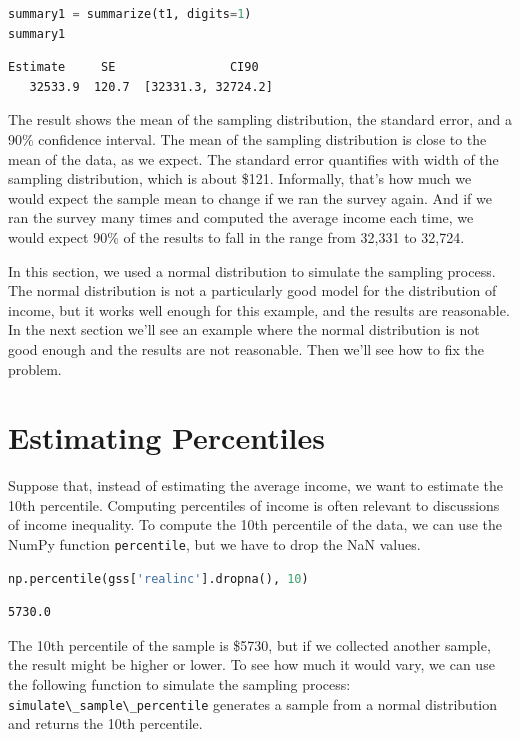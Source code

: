 \begin{lstlisting}[language=Python,style=source]
summary1 = summarize(t1, digits=1)
summary1
\end{lstlisting}

\begin{lstlisting}[style=output]
  Estimate     SE                CI90
   32533.9  120.7  [32331.3, 32724.2]
\end{lstlisting}

The result shows the mean of the sampling distribution, the standard
error, and a 90\% confidence interval. The mean of the sampling
distribution is close to the mean of the data, as we expect. The
standard error quantifies with width of the sampling distribution, which
is about \$121. Informally, that's how much we would expect the sample
mean to change if we ran the survey again. And if we ran the survey many
times and computed the average income each time, we would expect 90\% of
the results to fall in the range from 32,331 to 32,724.

In this section, we used a normal distribution to simulate the sampling
process. The normal distribution is not a particularly good model for
the distribution of income, but it works well enough for this example,
and the results are reasonable. In the next section we'll see an example
where the normal distribution is not good enough and the results are not
reasonable. Then we'll see how to fix the problem.

\hypertarget{estimating-percentiles}{%
\section{Estimating Percentiles}\label{estimating-percentiles}}

Suppose that, instead of estimating the average income, we want to
estimate the 10th percentile. Computing percentiles of income is often
relevant to discussions of income inequality. To compute the 10th
percentile of the data, we can use the NumPy function
\passthrough{\lstinline!percentile!}, but we have to drop the NaN
values.

\begin{lstlisting}[language=Python,style=source]
np.percentile(gss['realinc'].dropna(), 10)
\end{lstlisting}

\begin{lstlisting}[style=output]
5730.0
\end{lstlisting}

The 10th percentile of the sample is \$5730, but if we collected another
sample, the result might be higher or lower. To see how much it would
vary, we can use the following function to simulate the sampling
process: \passthrough{\lstinline!simulate\_sample\_percentile!}
generates a sample from a normal distribution and returns the 10th
percentile.

